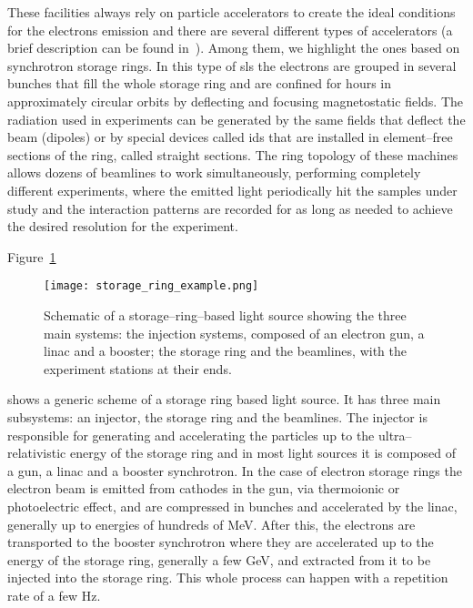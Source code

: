     These facilities always rely on particle accelerators to create the ideal conditions for the electrons emission and there are several different types of accelerators (a brief description can be found in~). Among them, we highlight the ones based on synchrotron storage rings. In this type of \gls{sls} the electrons are grouped in several bunches that fill the whole storage ring and are confined for hours in approximately circular orbits by deflecting and focusing magnetostatic fields. The radiation used in experiments can be generated by the same fields that deflect the beam (dipoles) or by special devices called \glspl{id} that are installed in element--free sections of the ring, called straight sections.
    The ring topology of these machines allows dozens of beamlines  to work simultaneously, performing completely different experiments, where the emitted light periodically hit the samples under study and the interaction patterns are recorded for as long as needed to achieve the desired resolution for the experiment.

    Figure~\ref{fig:light_source_example}
    \begin{figure}
        \center
        \texttt{[image: storage\_ring\_example.png]}
        \caption[Schematic of a storage--ring--based light source.]{Schematic of a storage--ring--based light source showing the three main systems: the injection systems, composed of an electron gun, a \gls{linac} and a booster; the storage ring and the beamlines, with the experiment stations at their ends.}
        \label{fig:light_source_example}
    \end{figure}
    shows a generic scheme of a storage ring based light source. It has three main subsystems: an injector, the storage ring and the beamlines. The injector is responsible for generating and accelerating the particles up to the ultra--relativistic energy of the storage ring and in most light sources it is composed of a gun, a \gls{linac} and a booster synchrotron. In the case of electron storage rings the electron beam is emitted from cathodes in the gun, via thermoionic or photoelectric effect, and are compressed in bunches and accelerated by the \gls{linac}, generally up to energies of hundreds of \si{\mega\electronvolt}. After this, the electrons are transported to the booster synchrotron where they are accelerated up to the energy of the storage ring, generally a few \si{\giga\electronvolt}, and extracted from it to be injected into the storage ring. This whole process can happen with a repetition rate of a few \si{\hertz}.

